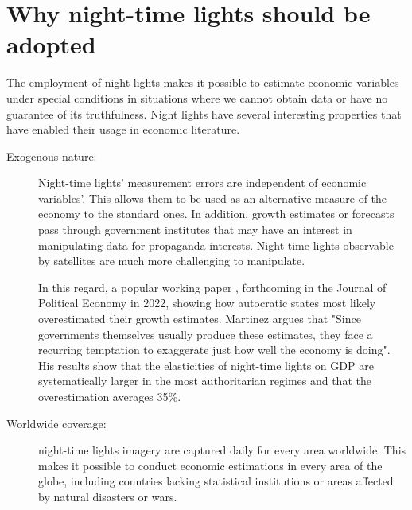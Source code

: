 \section{Why night-time lights should be adopted} %
The employment of night lights makes it possible to estimate economic variables under special conditions in situations where we cannot obtain data or have no guarantee of its truthfulness.
Night lights have several interesting properties that have enabled their usage in economic literature. 
\begin{description}
  \item[Exogenous nature:]
 Night-time lights' measurement errors are independent of economic variables'. This allows them to be used as an alternative measure of the economy to the standard ones. In addition, growth estimates or forecasts pass through government institutes that may have an interest in manipulating data for propaganda interests. Night-time lights observable by satellites are much more challenging to manipulate. 
 
In this regard, a popular working paper \citep{martinez2018much}, forthcoming in the Journal of Political Economy in 2022, showing how autocratic states most likely overestimated their growth estimates. Martinez argues that "Since governments themselves usually produce these estimates, they face a recurring temptation to exaggerate just how well the economy is doing".
His results show that the elasticities of night-time lights on GDP are systematically larger in the most authoritarian regimes and that the overestimation averages 35\%.
\item[Worldwide coverage:] night-time lights imagery are captured daily for every area worldwide. This makes it possible to conduct economic estimations in every area of the globe, including countries lacking statistical institutions or areas affected by natural disasters or wars. 


\end{description}
